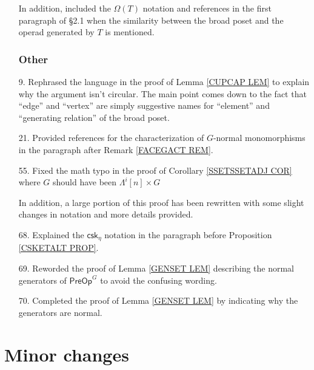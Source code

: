 \documentclass{article}
\begin{document}
\begin{itemize}
      In addition, included the $\Omega(T)$ notation and references in the first paragraph of \S 2.1 when the similarity between the broad poset and the operad generated by $T$ is mentioned. %
    
      

      
      \subsubsection*{Other}      
\item[9.] Rephrased the language in the proof of Lemma \ref{CUPCAP LEM} to explain why the argument isn't circular. The main point comes down to the fact that ``edge'' and ``vertex'' are simply suggestive names for ``element'' and ``generating relation'' of the broad poset. %


\item[21.] Provided references for the characterization of $G$-normal monomorphisms in the paragraph after Remark \ref{FACEGACT REM}. %


\item[55.] Fixed the math typo in the proof of Corollary \ref{SSETSSETADJ COR} where $G$ should have been $\Lambda^i[n] \times G$
      
      In addition, a large portion of this proof has been rewritten with some slight changes in notation and more details provided. %

      
\item[68.] Explained the $\mathsf{csk}_{\eta}$ notation in the paragraph before Proposition \ref{CSKETALT PROP}. %

      
\item[69.] Reworded the proof of Lemma \ref{GENSET LEM} describing the normal generators of $\mathsf{PreOp}^G$ to avoid the confusing wording. %

      
\item[70.] Completed the proof of Lemma \ref{GENSET LEM} by indicating why the generators are normal. %
 
                           
\end{itemize}



\section{Minor changes}
 
\end{document}
